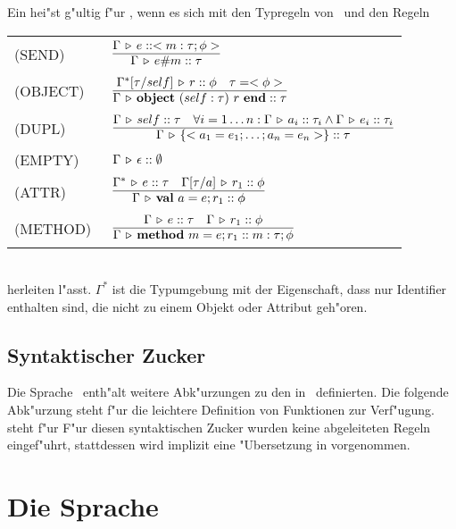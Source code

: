 Ein  hei"st g"ultig f"ur \LTWOO, wenn es sich mit den Typregeln von \LTWO\ und den Regeln\\[3mm]
\begin{tabular}{ll}
  \mbox{(SEND)\   } & $\regel{\Tj{\Gamma}{e}{<m:\tau;\phi>}}
                           {\Tj{\Gamma}{\send{e}{m}}{\tau}}$\\[5mm]
  \mbox{(OBJECT)\ } & $\regel{\Tj{\Gamma^*[\tau/self]}{r}{\phi}
                             \quad \tau = <\phi>}
                             {\Tj{\Gamma}{\object{self:\tau}{r}}{\tau}}$\\[5mm]
  \mbox{(DUPL)\   } & $\regel{\Tj{\Gamma}{self}{\tau}
                              \quad \forall i = 1 \ldots n :
                              \Tj{\Gamma}{a_i}{\tau_i} \wedge
                              \Tj{\Gamma}{e_i}{\tau_i}}
                             {\Tj{\Gamma}{\{< a_1 = e_1;\ldots;a_n = e_n >\}}{\tau}}$\\[5mm]
  \mbox{(EMPTY)\  } & $\Gamma \, \triangleright \, \epsilon\mathrel{::}\emptyset$\\[5mm]
  \mbox{(ATTR)\   } & $\regel{\Tj{\Gamma^*}{e}{\tau}
                              \quad \Tj{\Gamma[\tau/a]}{r_1}{\phi}}
                             {\Tj{\Gamma}{\val{a}{e}r_1}{\phi}}$ \\[5mm]
  \mbox{(METHOD)\ } & $\regel{\Tj{\Gamma}{e}{\tau}
                              \quad \Tj{\Gamma}{r_1}{\phi}}
                             {\Tj{\Gamma}{\method{m}{e}r_1}{m:\tau;\phi}}$
\end{tabular}\\[7mm]
herleiten l"asst. $\Gamma^*$ ist die Typumgebung mit der Eigenschaft, dass nur Identifier enthalten sind,
die nicht zu einem Objekt oder Attribut geh"oren.


\subsection{Syntaktischer Zucker}

Die Sprache \LTWOO\ enth"alt weitere Abk"urzungen zu den in \LTWO\ definierten. Die folgende Abk"urzung steht f"ur die leichtere Definition von Funktionen zur Verf"ugung.
\beqns
\eeqns
steht f"ur
\beqns
\eeqns
F"ur diesen syntaktischen Zucker wurden keine abgeleiteten Regeln eingef"uhrt, stattdessen wird implizit
eine "Ubersetzung in  vorgenommen.


\section{Die Sprache \LTHREE}


